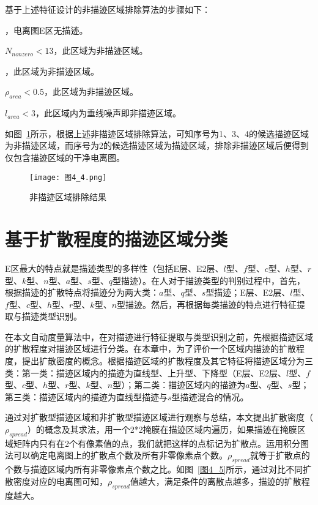 基于上述特征设计的非描迹区域排除算法的步骤如下：

\begin{enumerate}  
  
，电离图E区无描迹。
  
$N_{nonzero}<13$，此区域为非描迹区域。
 
，此区域为非描迹区域。
 
${\rho}_{area}<0.5$，此区域为非描迹区域。

$l_{area}<3$，此区域内为垂线噪声即非描迹区域。
\end{enumerate}  

如图~\ref{图4_4}所示，根据上述非描迹区域排除算法，可知序号为1、3、4的候选描迹区域为非描迹区域，而序号为2的候选描迹区域为描迹区域，排除非描迹区域后便得到仅包含描迹区域的干净电离图。

\begin{figure}[!ht]
\centering
\texttt{[image: 图4\_4.png]}
\caption{非描迹区域排除结果}
\label{图4_4}
\end{figure} 	
\section{基于扩散程度的描迹区域分类}
\label{4_2}

E区最大的特点就是描迹类型的多样性（包括E层、E2层、$l$型、$f$型、$c$型、$h$型、$r$型、$k$型、$n$型、$a$型、$s$型、$q$型描迹）。在人对于描迹类型的判别过程中，首先，根据描迹的扩散特点将描迹分为两大类：$a$型、$q$型、$s$型描迹；E层、E2层、$l$型、$f$型、$c$型、$h$型、$r$型、$k$型、$n$型描迹。然后，再根据每类描迹的特点进行特征提取与描迹类型识别。

在本文自动度量算法中，在对描迹进行特征提取与类型识别之前，先根据描迹区域的扩散程度对描迹区域进行分类。在本章中，为了评价一个区域内描迹的扩散程度，提出扩散密度的概念。根据描迹区域的扩散程度及其它特征将描迹区域分为三类：第一类：描迹区域内的描迹为直线型、上升型、下降型（E层、E2层、$l$型、$f$型、$c$型、$h$型、$r$型、$k$型、$n$型）；第二类：描迹区域内的描迹为$a$型、$q$型、$s$型；第三类：描迹区域内的描迹为直线型描迹与$s$型描迹混合的情况。

通过对扩散型描迹区域和非扩散型描迹区域进行观察与总结，本文提出扩散密度（$\rho_{spread}$）的概念及其求法，用一个2*2掩膜在描迹区域内遍历，如果描迹在掩膜区域矩阵内只有在2个有像素值的点，我们就把这样的点标记为扩散点。运用积分图法可以确定电离图上的扩散点个数及所有非零像素点个数。$\rho_{spread}$就等于扩散点的个数与描迹区域内所有非零像素点个数之比。如图~\ref{图4_5}所示，通过对比不同扩散密度对应的电离图可知，$\rho_{spread}$值越大，满足条件的离散点越多，描迹的扩散程度越大。

